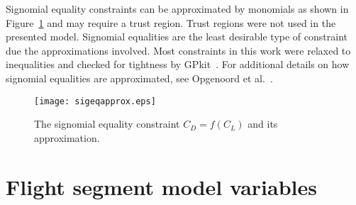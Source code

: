 
Signomial equality constraints can be approximated by monomials as shown in
Figure~\ref{f:sigeq} and may require a trust region. Trust regions were not
used in the presented model. Signomial equalities are the least desirable type
of constraint due the approximations involved. Most constraints in this work
were relaxed to inequalities and checked for tightness by GPkit~\cite{gpkit}. For
additional details on how signomial equalities are approximated, see Opgenoord
et al.~\cite{sigeqpaper}.

\begin{figure}[!ht]
\centering
\texttt{[image: sigeqapprox.eps]}
\caption{The signomial equality constraint $C_{D} = f(C_{L})$ and its
approximation.}\label{f:sigeq}
\end{figure}

\section{Flight segment model variables}
\label{a:flightprofilevars}

